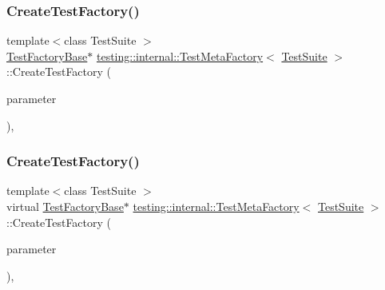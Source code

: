 \mbox{\label{classtesting_1_1internal_1_1_test_meta_factory_abd5d30fab71229deb5e63f5bb5ea3fd8}} 
\subsubsection{\texorpdfstring{CreateTestFactory()}{CreateTestFactory()}\hspace{0.1cm}{\footnotesize\ttfamily [2/3]}}
{\footnotesize\ttfamily template$<$class Test\+Suite $>$ \\
\mbox{\hyperlink{classtesting_1_1internal_1_1_test_factory_base}{Test\+Factory\+Base}}$\ast$ \mbox{\hyperlink{classtesting_1_1internal_1_1_test_meta_factory}{testing\+::internal\+::\+Test\+Meta\+Factory}}$<$ \mbox{\hyperlink{classtesting_1_1_test_suite}{Test\+Suite}} $>$\+::Create\+Test\+Factory (\begin{DoxyParamCaption}\item[{\mbox{\hyperlink{classtesting_1_1internal_1_1_test_meta_factory_a392ebab15dfdcfa1b54bbe15878aa9cd}{Param\+Type}}}]{parameter }\end{DoxyParamCaption})\hspace{0.3cm}{\ttfamily [inline]}, {\ttfamily [override]}}

\mbox{\label{classtesting_1_1internal_1_1_test_meta_factory_a32c5cd65dfc718151de0b324ce713ee8}} 
\subsubsection{\texorpdfstring{CreateTestFactory()}{CreateTestFactory()}\hspace{0.1cm}{\footnotesize\ttfamily [3/3]}}
{\footnotesize\ttfamily template$<$class Test\+Suite $>$ \\
virtual \mbox{\hyperlink{classtesting_1_1internal_1_1_test_factory_base}{Test\+Factory\+Base}}$\ast$ \mbox{\hyperlink{classtesting_1_1internal_1_1_test_meta_factory}{testing\+::internal\+::\+Test\+Meta\+Factory}}$<$ \mbox{\hyperlink{classtesting_1_1_test_suite}{Test\+Suite}} $>$\+::Create\+Test\+Factory (\begin{DoxyParamCaption}\item[{\mbox{\hyperlink{classtesting_1_1internal_1_1_test_meta_factory_a392ebab15dfdcfa1b54bbe15878aa9cd}{Param\+Type}}}]{parameter }\end{DoxyParamCaption})\hspace{0.3cm}{\ttfamily [inline]}, {\ttfamily [virtual]}}

